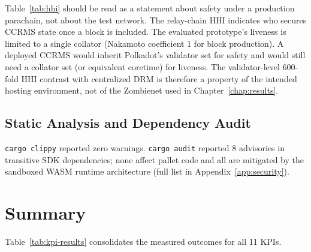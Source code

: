 Table~\ref{tab:hhi} should be read as a statement about safety under a production parachain, not about the test network. The relay-chain HHI indicates who secures CCRMS state once a block is included. The evaluated prototype's liveness is limited to a single collator (Nakamoto coefficient 1 for block production). A deployed CCRMS would inherit Polkadot's validator set for safety and would still need a collator set (or equivalent coretime) for liveness. The validator-level 600-fold HHI contrast with centralized DRM is therefore a property of the intended hosting environment, not of the Zombienet used in Chapter~\ref{chap:results}.

\subsection{Static Analysis and Dependency Audit}\label{subsec:static-analysis}

\texttt{cargo clippy} reported zero warnings. \texttt{cargo audit} reported 8 advisories in transitive SDK dependencies; none affect pallet code and all are mitigated by the sandboxed WASM runtime architecture (full list in Appendix~\ref{app:security}).

\section{Summary}\label{sec:chapter-7-summary}

Table~\ref{tab:kpi-results} consolidates the measured outcomes for all 11 KPIs.

